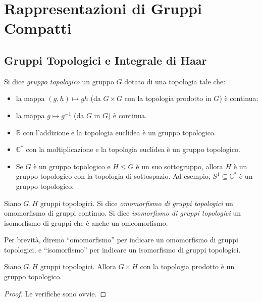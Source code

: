 \chapter{Rappresentazioni di Gruppi Compatti}

\section{Gruppi Topologici e Integrale di Haar}
\begin{definition}
Si dice \emph{gruppo topologico} un gruppo $G$ dotato di una topologia tale che:
\begin{itemize}
\item la mappa $(g,h)\mapsto gh$ (da $G\times G$ con la topologia prodotto in $G$) è continua;
\item la mappa $g\mapsto g^{-1}$ (da $G$ in $G$) è continua.
\end{itemize}
\end{definition}
\begin{example}\leavevmode
\begin{itemize}
\item $\mathbb{R}$ con l'addizione e la topologia euclidea è un gruppo topologico.
\item $\mathbb{C}^*$ con la moltiplicazione e la topologia euclidea è un gruppo topologico.
\item Se $G$ è un gruppo topologico e $H\le G$ è un suo sottogruppo, allora $H$ è un gruppo topologico con la topologia di sottospazio. Ad esempio, $S^1\subseteq\mathbb{C}^*$ è un gruppo topologico.
\end{itemize}

\end{example}
\begin{definition}
Siano $G\comma H$ gruppi topologici. Si dice \emph{omomorfismo di gruppi topologici} un omomorfismo di gruppi continuo. Si dice \emph{isomorfismo di gruppi topologici} un isomorfismo di gruppi che è anche un omeomorfismo.
\end{definition}
Per brevità, diremo ``omomorfismo'' per indicare un omomorfismo di gruppi topologici, e ``isomorfismo'' per indicare un isomorfismo di gruppi topologici.
\begin{proposition}
Siano $G\comma H$ gruppi topologici. Allora $G\times H$ con la topologia prodotto è un gruppo topologico.
\end{proposition}
\begin{proof}
Le verifiche sono ovvie.
\end{proof}

